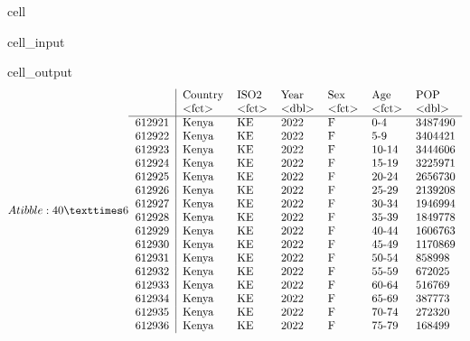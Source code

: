 \documentclass[letterpaper,10pt,english]{jupyterBook}
\begin{document}
\begin{sphinxuseclass}{cell}\begin{sphinxVerbatimInput}

\begin{sphinxuseclass}{cell_input}
\begin{sphinxVerbatim}[commandchars=\\\{\}]
\end{sphinxVerbatim}

\end{sphinxuseclass}\end{sphinxVerbatimInput}
\begin{sphinxVerbatimOutput}

\begin{sphinxuseclass}{cell_output}\begin{equation*}
\begin{split}A tibble: 40 × 6
\begin{tabular}{r|llllll}
  & Country & ISO2 & Year & Sex & Age & POP\\
  & <fct> & <fct> & <dbl> & <fct> & <fct> & <dbl>\\
\hline
	612921 & Kenya & KE & 2022 & F & 0-4   & 3487490\\
	612922 & Kenya & KE & 2022 & F & 5-9   & 3404421\\
	612923 & Kenya & KE & 2022 & F & 10-14 & 3444606\\
	612924 & Kenya & KE & 2022 & F & 15-19 & 3225971\\
	612925 & Kenya & KE & 2022 & F & 20-24 & 2656730\\
	612926 & Kenya & KE & 2022 & F & 25-29 & 2139208\\
	612927 & Kenya & KE & 2022 & F & 30-34 & 1946994\\
	612928 & Kenya & KE & 2022 & F & 35-39 & 1849778\\
	612929 & Kenya & KE & 2022 & F & 40-44 & 1606763\\
	612930 & Kenya & KE & 2022 & F & 45-49 & 1170869\\
	612931 & Kenya & KE & 2022 & F & 50-54 &  858998\\
	612932 & Kenya & KE & 2022 & F & 55-59 &  672025\\
	612933 & Kenya & KE & 2022 & F & 60-64 &  516769\\
	612934 & Kenya & KE & 2022 & F & 65-69 &  387773\\
	612935 & Kenya & KE & 2022 & F & 70-74 &  272320\\
	612936 & Kenya & KE & 2022 & F & 75-79 &  168499\\

\end{tabular}
\end{split}
\end{equation*}
\end{sphinxuseclass}
\end{sphinxVerbatimOutput}
\end{sphinxuseclass}
\end{document}
